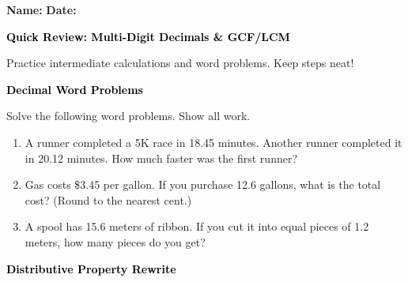 \documentclass[12pt, letterpaper, fleqn]{article}
\begin{document}
\textbf{Name:} \underline{\hspace{5cm}}
\hfill
\textbf{Date:} \underline{\hspace{3cm}}\\

\begin{tcolorbox}[colback=black!10]
    \large\textcolor{black}{\textbf{Quick Review: Multi-Digit Decimals \& GCF/LCM}}
\end{tcolorbox}

\vspace{3mm}
\noindent
Practice intermediate calculations and word problems. Keep steps neat!

\vspace{4mm}

\begin{tcolorbox}[colback=black!10]
\large\textcolor{black}{\textbf{Decimal Word Problems}}
\end{tcolorbox}

\noindent
Solve the following word problems. Show all work.

\vspace{3mm}
\begin{enumerate}[itemsep=2.2cm, leftmargin=0.6cm]
\item A runner completed a 5K race in 18.45 minutes. Another runner completed it in 20.12 minutes. How much faster was the first runner?

\vspace{2cm}

\item Gas costs \$3.45 per gallon. If you purchase 12.6 gallons, what is the total cost? (Round to the nearest cent.)

\vspace{2cm}

\item A spool has 15.6 meters of ribbon. If you cut it into equal pieces of 1.2 meters, how many pieces do you get?

\vspace{2cm}

\end{enumerate}

\newpage

\begin{tcolorbox}[colback=black!10]
\large\textcolor{black}{\textbf{Distributive Property Rewrite}}
\end{tcolorbox}
\end{document}
